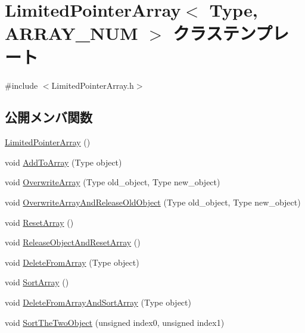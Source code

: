 \hypertarget{class_limited_pointer_array}{}\section{Limited\+Pointer\+Array$<$ Type, A\+R\+R\+A\+Y\+\_\+\+N\+UM $>$ クラステンプレート}
\label{class_limited_pointer_array}


{\ttfamily \#include $<$Limited\+Pointer\+Array.\+h$>$}

\subsection*{公開メンバ関数}
\begin{DoxyCompactItemize}
\item 
\mbox{\hyperlink{class_limited_pointer_array_acab3e47d77fcd7ed7735a735e1aaf8f9}{Limited\+Pointer\+Array}} ()
\item 
void \mbox{\hyperlink{class_limited_pointer_array_a57eb08357204668710021965425f4f46}{Add\+To\+Array}} (Type object)
\item 
void \mbox{\hyperlink{class_limited_pointer_array_a7cf64a1731ab6d0d63182b6c223fae0b}{Overwrite\+Array}} (Type old\+\_\+object, Type new\+\_\+object)
\item 
void \mbox{\hyperlink{class_limited_pointer_array_a6c46bb77df04a9e1226025f8c48e26cb}{Overwrite\+Array\+And\+Release\+Old\+Object}} (Type old\+\_\+object, Type new\+\_\+object)
\item 
void \mbox{\hyperlink{class_limited_pointer_array_ae5a41fe945c1ee5ea73116b823011a8c}{Reset\+Array}} ()
\item 
void \mbox{\hyperlink{class_limited_pointer_array_a5e34faa11f4b901153f85428027aa21e}{Release\+Object\+And\+Reset\+Array}} ()
\item 
void \mbox{\hyperlink{class_limited_pointer_array_a02cfaed541d27980883ec9eb90ad3813}{Delete\+From\+Array}} (Type object)
\item 
void \mbox{\hyperlink{class_limited_pointer_array_a1093a96cb123b3fed52bdfcea1055f33}{Sort\+Array}} ()
\item 
void \mbox{\hyperlink{class_limited_pointer_array_a32dd58543bee490df6dcea079ebe4586}{Delete\+From\+Array\+And\+Sort\+Array}} (Type object)
\item 
void \mbox{\hyperlink{class_limited_pointer_array_a0d33dc5dd8ed01bb00accd6378aa1b47}{Sort\+The\+Two\+Object}} (unsigned index0, unsigned index1)

\end{DoxyCompactItemize}
